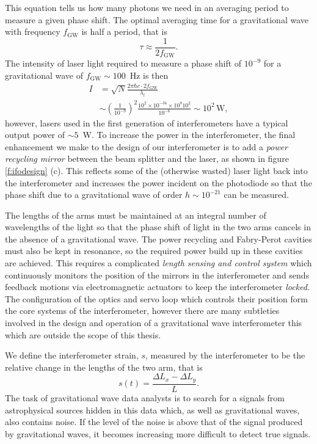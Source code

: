 This equation tells us how many photons we need in an averaging period to
measure a given phase shift. The optimal averaging time for a gravitational
wave with frequency $f_\mathrm{GW}$ is half a period, that is
\begin{equation}
\tau \approx \frac{1}{2 f_\mathrm{GW}}.
\end{equation}
The intensity of laser light required to measure a phase shift of $10^{-9}$
for a gravitational wave of $f_\mathrm{GW} \sim 100$~Hz is then
\begin{equation}
\begin{split}
I &= \sqrt{N} \frac{2 \pi \hbar c \cdot 2f_\mathrm{GW}}{\lambda_l} \\
&\sim \left(\frac{1}{10^{-9}}\right)^2 
\frac{10^2 \times 10^{-34} \times 10^{8} 10^2 } { 10^{-6} } \sim 10^2\,
\mathrm{W},
\end{split}
\end{equation}
however, lasers used in the first generation of interferometers have a typical
output power of $\sim 5$~W. To increase the power in the interferometer, the
final enhancement we make to the design of our interferometer is to add a
\emph{power recycling mirror} between the beam splitter and the laser, as
shown in figure \ref{f:ifodesign} (c). This reflects some of the (otherwise
wasted) laser light back into the interferometer and increases the power
incident on the photodiode so that the phase shift due to a gravitational wave
of order $h \sim 10^{-21}$ can be measured.

The lengths of the arms must be maintained at an integral number of
wavelengths of the light so that the phase shift of light in the two arms
cancels in the absence of a gravitational wave. The power recycling and
Fabry-Perot cavities must also be kept in resonance, so the required power
build up in these cavities are achieved. This requires a complicated
\emph{length sensing and control system}\cite{Fritschel:2001} which
continuously monitors the position of the mirrors in the interferometer and
sends feedback motions via electromagnetic actuators to keep the
interferometer \emph{locked}. The configuration of the optics and servo loop
which controls their position form the core systems of the interferometer,
however there are many subtleties involved in the design and operation of a
gravitational wave interferometer this which are outside the scope of this
thesis.

We define the interferometer strain, $s$, measured by the interferometer
to be the relative change in the lengths of the two arm, that is
\begin{equation}
s(t) = \frac{\Delta L_x - \Delta L_y}{L}.
\end{equation}
The task of gravitational wave data analysts is to search for a signals from
astrophysical sources hidden in this data which, as well as gravitational
waves, also contains noise. If the level of the noise is above that of the
signal produced by gravitational waves, it becomes increasing more difficult
to detect true signals.

